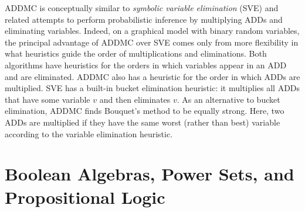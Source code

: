 \textsc{ADDMC} \citep{DBLP:conf/aaai/DudekPV20} is conceptually similar to
\emph{symbolic variable elimination} (SVE) \citep{DBLP:conf/aaai/SannerA12} and
related attempts \citep{DBLP:conf/ijcai/SannerM05} to perform probabilistic
inference by multiplying ADDs and eliminating variables. Indeed, on a graphical
model with binary random variables, the principal advantage of \textsc{ADDMC}
over SVE comes only from more flexibility in what heuristics guide the order of
multiplications and eliminations. Both algorithms have heuristics for the orders
in which variables appear in an ADD and are eliminated. \textsc{ADDMC} also has
a heuristic for the order in which ADDs are multiplied. SVE has a built-in
bucket elimination \citep{DBLP:journals/ai/Dechter99} heuristic: it multiplies
all ADDs that have some variable $v$ and then eliminates $v$. As an alternative
to bucket elimination, \textsc{ADDMC} finds Bouquet's method
\citep{bouquet1999gestion} to be equally strong. Here, two ADDs are multiplied
if they have the same worst (rather than best) variable according to the
variable elimination heuristic.

\section{Boolean Algebras, Power Sets, and Propositional
  Logic}\label{sec:prelims}

